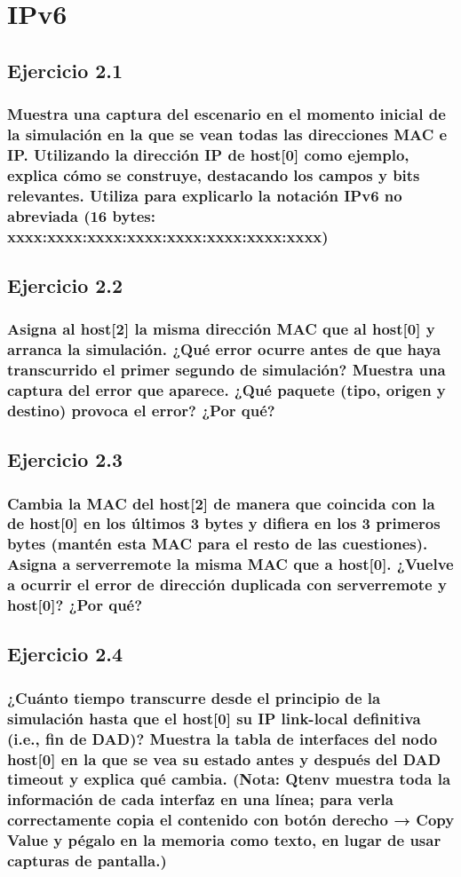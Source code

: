 \chapter{IPv6}
\label{chap:ipv6}

\section{Ejercicio 2.1}
\subsection{Muestra una captura del escenario en el momento inicial de la simulación en la que se vean todas las
direcciones MAC e IP. Utilizando la dirección IP de host[0] como ejemplo, explica cómo se construye, destacando
los campos y bits relevantes. Utiliza para explicarlo la notación IPv6 no abreviada (16 bytes:
xxxx:xxxx:xxxx:xxxx:xxxx:xxxx:xxxx:xxxx)}

\section{Ejercicio 2.2}
\subsection{Asigna al host[2] la misma dirección MAC que al host[0] y arranca la simulación. ¿Qué error ocurre antes de
que haya transcurrido el primer segundo de simulación? Muestra una captura del error que aparece. ¿Qué
paquete (tipo, origen y destino) provoca el error? ¿Por qué?}

\section{Ejercicio 2.3}
\subsection{Cambia la MAC del host[2] de manera que coincida con la de host[0] en los últimos 3 bytes y difiera en los 3
primeros bytes (mantén esta MAC para el resto de las cuestiones). Asigna a serverremote la misma MAC que a
host[0]. ¿Vuelve a ocurrir el error de dirección duplicada con serverremote y host[0]? ¿Por qué?}

\section{Ejercicio 2.4}
\subsection{¿Cuánto tiempo transcurre desde el principio de la simulación hasta que el host[0] su IP link-local definitiva
(i.e., fin de DAD)? Muestra la tabla de interfaces del nodo host[0] en la que se vea su estado antes y después del
DAD timeout y explica qué cambia. (Nota: Qtenv muestra toda la información de cada interfaz en una línea;
para verla correctamente copia el contenido con botón derecho → Copy Value y pégalo en la memoria como
texto, en lugar de usar capturas de pantalla.)}

